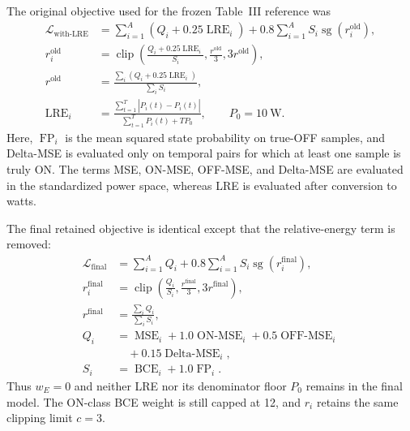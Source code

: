 \documentclass[conference]{IEEEtran}
\begin{document}
The original objective used for the frozen Table~III reference was
\begin{equation}
\begin{aligned}
\mathcal{L}_{\mathrm{with\text{-}LRE}}
 &=\sum_{i=1}^{A}\left(Q_i+0.25\operatorname{LRE}_{i}\right)
 +0.8\sum_{i=1}^{A}S_i\operatorname{sg}\!\left(r_i^{\mathrm{old}}\right),\\
r_i^{\mathrm{old}}
 &=\operatorname{clip}\!\left(
 \frac{Q_i+0.25\operatorname{LRE}_{i}}{S_i},
 \frac{r^{\mathrm{old}}}{3},3r^{\mathrm{old}}\right),\\
r^{\mathrm{old}}
 &=\frac{\sum_i\left(Q_i+0.25\operatorname{LRE}_{i}\right)}{\sum_iS_i},\\
\operatorname{LRE}_{i}
 &=\frac{\sum_{t=1}^{T}|\widehat{P}_i(t)-P_i(t)|}
 {\sum_{t=1}^{T}P_i(t)+TP_0},\qquad P_0=10~\mathrm{W}.
\label{eq:appendix-objective-before}
\end{aligned}
\end{equation}
Here, $\operatorname{FP}_{i}$ is the mean squared state probability on true-OFF samples, and Delta-MSE is evaluated only on temporal pairs for which at least one sample is truly ON.  The terms MSE, ON-MSE, OFF-MSE, and Delta-MSE are evaluated in the standardized power space, whereas LRE is evaluated after conversion to watts.

The final retained objective is identical except that the relative-energy term is removed:
\begin{equation}
\begin{aligned}
\mathcal{L}_{\mathrm{final}}
 &=\sum_{i=1}^{A}Q_i+0.8\sum_{i=1}^{A}S_i\operatorname{sg}\!\left(r_i^{\mathrm{final}}\right),\\
r_i^{\mathrm{final}}
 &=\operatorname{clip}\!\left(\frac{Q_i}{S_i},\frac{r^{\mathrm{final}}}{3},3r^{\mathrm{final}}\right),\\
r^{\mathrm{final}}&=\frac{\sum_iQ_i}{\sum_iS_i},\\
Q_i &=\operatorname{MSE}_{i}+1.0\operatorname{ON\text{-}MSE}_{i}
 +0.5\operatorname{OFF\text{-}MSE}_{i}\\
&\quad +0.15\operatorname{Delta\text{-}MSE}_{i},\\
S_i &=\operatorname{BCE}_{i}+1.0\operatorname{FP}_{i}.
\label{eq:appendix-objective-after}
\end{aligned}
\end{equation}
Thus $w_E=0$ and neither LRE nor its denominator floor $P_0$ remains in the final model.  The ON-class BCE weight is still capped at 12, and $r_i$ retains the same clipping limit $c=3$.
\end{document}
